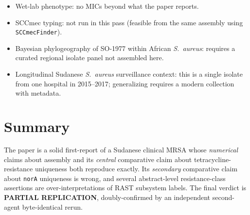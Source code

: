 \documentclass[11pt]{article}
\begin{document}
\begin{itemize}[leftmargin=1.5em]
\item Wet-lab phenotype: no MICs beyond what the paper reports.
\item SCCmec typing: not run in this pass (feasible from the same
      assembly using \texttt{SCCmecFinder}).
\item Bayesian phylogeography of SO-1977 within African \emph{S.\ aureus}:
      requires a curated regional isolate panel not assembled here.
\item Longitudinal Sudanese \emph{S.\ aureus} surveillance context:
      this is a single isolate from one hospital in 2015--2017;
      generalizing requires a modern collection with metadata.
\end{itemize}

\section*{Summary}

The paper is a solid first-report of a Sudanese clinical MRSA
whose \emph{numerical} claims about assembly and its \emph{central}
comparative claim about tetracycline-resistance uniqueness both
reproduce exactly. Its \emph{secondary} comparative claim about
\texttt{norA} uniqueness is wrong, and several abstract-level
resistance-class assertions are over-interpretations of RAST subsystem
labels. The final verdict is \textbf{PARTIAL REPLICATION},
doubly-confirmed by an independent second-agent byte-identical rerun.
\end{document}

